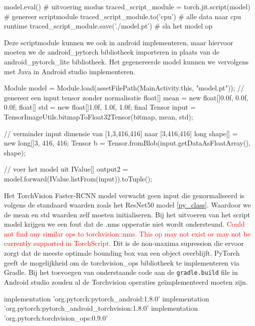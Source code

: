 \begin{python}
model.eval() # uitvoering modus
traced_script_module = torch.jit.script(model) # genereer scriptmodule
traced_script_module.to('cpu') # alle data naar cpu runtime
traced_script_module.save('./model.pt') # sla het model op 
\end{python}

Deze scriptmodule kunnen we ook in android implementeren, maar hiervoor moeten we de android\_pytorch bibliotheek importeren in plaats van de android\_pytorch\_lite bibliotheek.
Het gegenereerde model kunnen we vervolgens met Java in Android studio implementeren.

\begin{python}
Module model = Module.load(assetFilePath(MainActivity.this, "model.pt"));
// genereer een input tensor zonder normalisatie
float[] mean = new float[]{0.0f, 0.0f, 0.0f};
float[] std = new float[]{1.0f, 1.0f, 1.0f};
final Tensor input = TensorImageUtils.bitmapToFloat32Tensor(bitmap, mean, std);

// verminder input dimensie van [1,3,416,416] naar [3,416,416]
long shape[] = new long[]{3, 416, 416};
Tensor b = Tensor.fromBlob(input.getDataAsFloatArray(), shape);

// voer het model uit
IValue[] output2 = model.forward(IValue.listFrom(input)).toTuple();
\end{python}

Het TorchVision Faster-RCNN model verwacht geen input die genormaliseerd is volgens de standaard waarden zoals het ResNet50 model \ref{py_class}.
Waardoor we de mean en std waarden zelf moeten initialiseren.
Bij het uitvoeren van het script model krijgen we een fout dat de .nms opperatie niet wordt ondersteund.
\textcolor{red}{Could not find any similar ops to torchvision::nms. This op may not exist or may not be currently supported in TorchScript.}
\newline
Dit is de non-maxima supression die ervoor zorgt dat de meeste optimale bounding box van een object overblijft. 
PyTorch geeft de mogelijkheid om de torchvision\_ops bibliotheek te implementeren via Gradle.
Bij het toevoegen van onderstaande code aan de \texttt{gradle.build} file in Android studio zouden al de Torchvision operaties ge\"implementeerd moeten zijn.

\begin{python}
implementation 'org.pytorch:pytorch_android:1.8.0'
implementation 'org.pytorch:pytorch_android_torchvision:1.8.0'
implementation 'org.pytorch:torchvision_ops:0.9.0'
\end{python}

